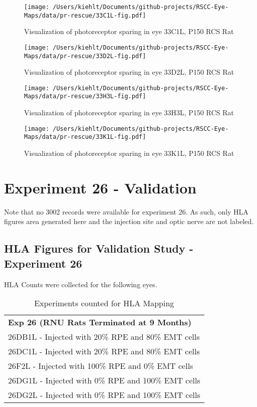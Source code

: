 \documentclass{article}
\begin{document}
\begin{center}
\begin{figure}
\texttt{[image: /Users/kiehlt/Documents/github-projects/RSCC-Eye-Maps/data/pr-rescue/33C1L-fig.pdf]}
\caption{Visualization of photoreceptor sparing in eye 33C1L, P150 RCS Rat}
\label{fig:33C1L}
\end{figure}

\end{center}
\begin{center}
\begin{figure}
\texttt{[image: /Users/kiehlt/Documents/github-projects/RSCC-Eye-Maps/data/pr-rescue/33D2L-fig.pdf]}
\caption{Visualization of photoreceptor sparing in eye 33D2L, P150 RCS Rat}
\label{fig:33D2L}
\end{figure}

\end{center}
\begin{center}
\begin{figure}
\texttt{[image: /Users/kiehlt/Documents/github-projects/RSCC-Eye-Maps/data/pr-rescue/33H3L-fig.pdf]}
\caption{Visualization of photoreceptor sparing in eye 33H3L, P150 RCS Rat}
\label{fig:33H3L}
\end{figure}

\end{center}
\begin{center}
\begin{figure}
\texttt{[image: /Users/kiehlt/Documents/github-projects/RSCC-Eye-Maps/data/pr-rescue/33K1L-fig.pdf]}
\caption{Visualization of photoreceptor sparing in eye 33K1L, P150 RCS Rat}
\label{fig:33K1L}
\end{figure}

\end{center}\newpage

\section{Experiment 26 - Validation}
Note that no 3002 records were available for experiment 26. As such, only HLA figures area generated here and the injection site and optic nerve are not labeled.
\subsection{HLA Figures for Validation Study - Experiment 26}
HLA Counts were collected for the following eyes.
\begin{table}[]
\centering
\begin{tabular}{l}
\textbf{Exp 26 (RNU Rats Terminated at 9 Months) } \\
26DB1L -  Injected with 20\% RPE and 80\% EMT cells \\
26DC1L - Injected with 20\% RPE and 80\% EMT cells \\
26F2L - Injected with 100\% RPE and 0\% EMT cells \\
26DG1L -  Injected with 0\% RPE and 100\% EMT cells  \\
26DG2L -  Injected with 0\% RPE and 100\% EMT cells\\
\end{tabular}
\caption{Experiments counted for HLA Mapping}
\end{table}
\end{document}
